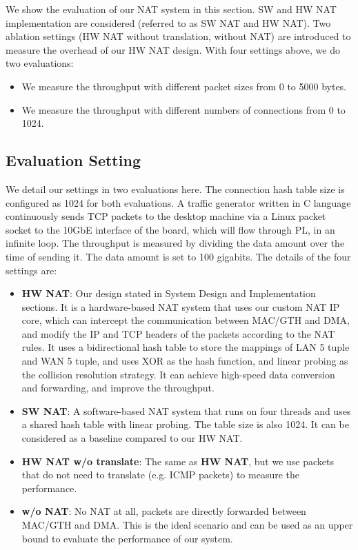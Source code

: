 We show the evaluation of our NAT system in this section.
SW and HW NAT implementation are considered (referred to as SW NAT and HW NAT). Two ablation settings (HW NAT without translation, without NAT) are introduced to measure the overhead of our HW NAT design.
With four settings above, we do two evaluations:
\begin{itemize}
    \item We measure the throughput with different packet sizes from 0 to 5000 bytes.
    \item We measure the throughput with different numbers of connections from 0 to 1024.
\end{itemize}






\subsection{Evaluation Setting}

We detail our settings in two evaluations here. The connection hash table size is configured as 1024 for both evaluations. A traffic generator written in C language continuously sends TCP packets to the desktop machine via a Linux packet socket to the 10GbE interface of the board, which will flow through PL, in an infinite loop. The throughput is measured by dividing the data amount over the time of sending it. The data amount is set to 100 gigabits.
The details of the four settings are:

\begin{itemize}
    \item {\textbf{HW NAT}}: Our design stated in System Design and Implementation sections. It is a hardware-based NAT system that uses our custom NAT IP core, which can intercept the communication between MAC/GTH and DMA, and modify the IP and TCP headers of the packets according to the NAT rules. It uses a bidirectional hash table to store the mappings of LAN 5 tuple and WAN 5 tuple, and uses XOR as the hash function, and linear probing as the collision resolution strategy. It can achieve high-speed data conversion and forwarding, and improve the throughput.
    \item {\textbf{SW NAT}}: A software-based NAT system that runs on four threads and uses a shared hash table with linear probing. The table size is also 1024. It can be considered as a baseline compared to our HW NAT.
    \item {\textbf{HW NAT w/o translate}}: The same as \textbf{HW NAT}, but we use packets that do not need to translate (e.g. ICMP packets) to measure the performance.
    \item {\textbf{w/o NAT}}: No NAT at all, packets are directly forwarded between MAC/GTH and DMA. This is the ideal scenario and can be used as an upper bound to evaluate the performance of our system.
\end{itemize}


